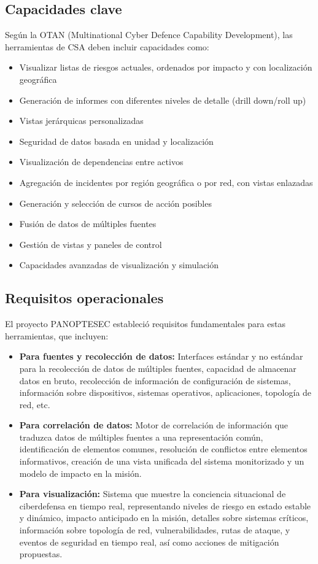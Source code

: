 \subsection{Capacidades clave}
Según la OTAN (Multinational Cyber Defence Capability Development), las herramientas de CSA deben incluir capacidades como:
\begin{itemize}
   \item Visualizar listas de riesgos actuales, ordenados por impacto y con localización geográfica
   \item Generación de informes con diferentes niveles de detalle (drill down/roll up)
   \item Vistas jerárquicas personalizadas
   \item Seguridad de datos basada en unidad y localización
   \item Visualización de dependencias entre activos
   \item Agregación de incidentes por región geográfica o por red, con vistas enlazadas
   \item Generación y selección de cursos de acción posibles
   \item Fusión de datos de múltiples fuentes
   \item Gestión de vistas y paneles de control
   \item Capacidades avanzadas de visualización y simulación
\end{itemize}

\subsection{Requisitos operacionales}
El proyecto PANOPTESEC estableció requisitos fundamentales para estas herramientas, que incluyen:
\begin{itemize}
   \item \textbf{Para fuentes y recolección de datos:} Interfaces estándar y no estándar para la recolección de datos de múltiples fuentes, capacidad de almacenar datos en bruto, recolección de información de configuración de sistemas, información sobre dispositivos, sistemas operativos, aplicaciones, topología de red, etc.
   
   \item \textbf{Para correlación de datos:} Motor de correlación de información que traduzca datos de múltiples fuentes a una representación común, identificación de elementos comunes, resolución de conflictos entre elementos informativos, creación de una vista unificada del sistema monitorizado y un modelo de impacto en la misión.
   
   \item \textbf{Para visualización:} Sistema que muestre la conciencia situacional de ciberdefensa en tiempo real, representando niveles de riesgo en estado estable y dinámico, impacto anticipado en la misión, detalles sobre sistemas críticos, información sobre topología de red, vulnerabilidades, rutas de ataque, y eventos de seguridad en tiempo real, así como acciones de mitigación propuestas.
\end{itemize}

